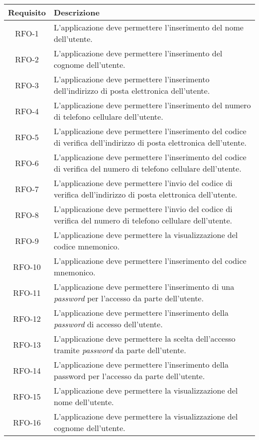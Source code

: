 \begin{longtable}{|c|p{10.5cm}|}
	\hline
	\rowcolor{gray}
	\textbf{Requisito} & \textbf{Descrizione} \\
	\hline
	RFO-1     & L'applicazione deve permettere l'inserimento del nome dell'utente. \\
	\hline
	RFO-2     & L'applicazione deve permettere l'inserimento del cognome dell'utente. \\
	\hline
	RFO-3     & L'applicazione deve permettere l'inserimento dell'indirizzo di posta elettronica dell'utente. \\
	\hline
	RFO-4     & L'applicazione deve permettere l'inserimento del numero di telefono cellulare dell'utente. \\
	\hline
	RFO-5     & L'applicazione deve permettere l'inserimento del codice di verifica dell'indirizzo di posta elettronica dell'utente. \\
	\hline
	RFO-6     & L'applicazione deve permettere l'inserimento del codice di verifica del numero di telefono cellulare dell'utente. \\
	\hline
	RFO-7     & L'applicazione deve permettere l'invio del codice di verifica dell'indirizzo di posta elettronica dell'utente. \\
	\hline
	RFO-8     & L'applicazione deve permettere l'invio del codice di verifica del numero di telefono cellulare dell'utente. \\
	\hline
	RFO-9     & L'applicazione deve permettere la visualizzazione del codice mnemonico. \\
	\hline
	RFO-10    & L'applicazione deve permettere l'inserimento del codice mnemonico. \\
	\hline
	RFO-11    & L'applicazione deve permettere l'inserimento di una \textit{password} per l'accesso da parte dell'utente. \\
	\hline
	RFO-12    & L'applicazione deve permettere l'inserimento della \textit{password} di accesso dell'utente. \\
	\hline
	RFO-13    & L'applicazione deve permettere la scelta dell'accesso tramite \textit{password} da parte dell'utente. \\
	\hline
	RFO-14    & L'applicazione deve permettere l'inserimento della password per l'accesso da parte dell'utente. \\
	\hline
	RFO-15    & L'applicazione deve permettere la visualizzazione del nome dell'utente. \\
	\hline
	RFO-16    & L'applicazione deve permettere la visualizzazione del cognome dell'utente. \\

\end{longtable}
